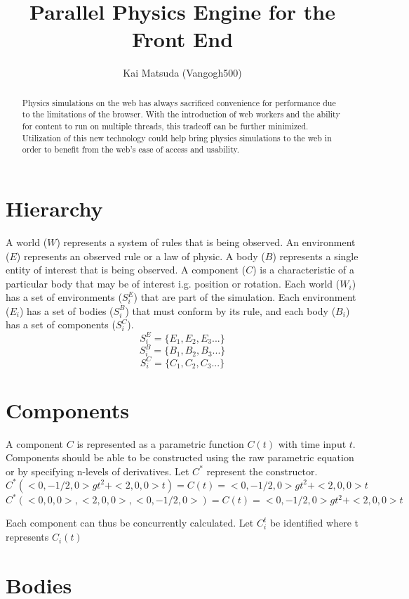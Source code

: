 \documentclass[preprint,12pt]{elsarticle}
\begin{document}
\begin{frontmatter}
\title{Parallel Physics Engine for the Front End}
\author{Kai Matsuda (Vangogh500)}
\address{MA, US}
\begin{abstract}
Physics simulations on the web has always sacrificed convenience for performance due to the limitations of the browser. With the introduction of web workers and the ability for content to run on multiple threads, this tradeoff can be further minimized. Utilization of this new technology could help bring physics simulations to the web in order to benefit from the web's ease of access and usability.
\end{abstract}
\end{frontmatter}
\linenumbers
\section{Hierarchy}
A world ($W$) represents a system of rules that is being observed. An environment ($E$) represents an observed rule or a law of physic. A body ($B$) represents a single entity of interest that is being observed. A component ($C$) is a characteristic of a particular body that may be of interest i.g. position or rotation. Each world ($W_i$) has a set of environments ($S_i^E$) that are part of the simulation. Each environment ($E_i$) has a set of bodies ($S_i^B$) that must conform by its rule, and each body ($B_i$) has a set of components ($S_i^C$).
\[ S_i^E = \{ E_1, E_2, E_3... \} \]
\[ S_i^B = \{ B_1, B_2, B_3... \} \]
\[ S_i^C = \{ C_1, C_2, C_3... \} \]
\section{Components}
A component $C$ is represented as a parametric function $C(t)$ with time input $t$. Components should be able to be constructed using the raw parametric equation or by specifying n-levels of derivatives. Let $C^*$ represent the constructor.
\[C^*(<0,-1/2,0>gt^2+<2,0,0>t)= C(t) = <0,-1/2,0>gt^2+<2,0,0>t \]
\[C^*(<0,0,0>,<2,0,0>,<0,-1/2,0>)= C(t) = <0,-1/2,0>gt^2+<2,0,0>t \]

Each component can thus be concurrently calculated. Let $C_i^t$ be identified where t represents $C_i(t)$


\section{Bodies}
\end{document}
